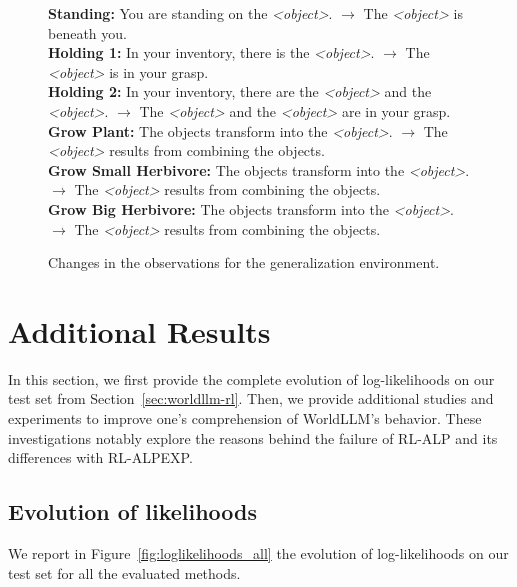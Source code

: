 \documentclass{article}
\begin{document}
\begin{figure}[hbt]
    \begin{promptbox}{}
        \textbf{Standing: }
        You are standing on the \textit{<object>}. $\longrightarrow$ The \textit{<object>} is beneath you.
        \\
        \textbf{Holding 1: }
        In your inventory, there is the \textit{<object>}. $\longrightarrow$
        The \textit{<object>} is in your grasp.
        \\
        \textbf{Holding 2: }
        In your inventory, there are the \textit{<object>} and the \textit{<object>}. $\longrightarrow$
        The \textit{<object>} and the \textit{<object>} are in your grasp.
        \\
        \textbf{Grow Plant: }
        The objects transform into the \textit{<object>}. $\longrightarrow$
        The \textit{<object>} results from combining the objects.
        \\
        \textbf{Grow Small Herbivore: }
        The objects transform into the \textit{<object>}. $\longrightarrow$
        The \textit{<object>} results from combining the objects.
        \\
        \textbf{Grow Big Herbivore: }
        The objects transform into the \textit{<object>}. $\longrightarrow$
        The \textit{<object>} results from combining the objects.
    \end{promptbox}
    \caption{Changes in the observations for the generalization environment.}
    \label{prompt:generalization}
\end{figure}

\section{Additional Results} \label{app:additional_results}
In this section, we first provide the complete evolution of log-likelihoods on our test set from Section~\ref{sec:worldllm-rl}. Then, we provide additional studies and experiments to improve one's comprehension of WorldLLM's behavior. These investigations notably explore the reasons behind the failure of RL-ALP and its differences with RL-ALPEXP.


\subsection{Evolution of likelihoods}
We report in Figure~\ref{fig:loglikelihoods_all} the evolution of log-likelihoods on our test set for all the evaluated methods.
\end{document}
